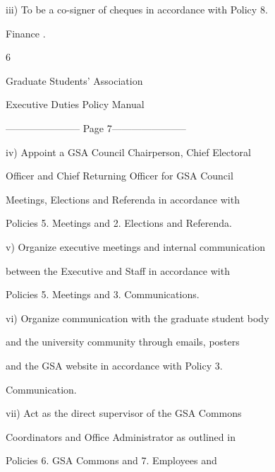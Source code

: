   

         iii)      To be a co-signer of cheques in accordance with Policy 8.  

                   Finance .   

  



                                                   6  

                                      

                                    Graduate Students’ Association  

                                    Executive Duties Policy Manual  

  


----------------------- Page 7-----------------------

         iv)      Appoint  a  GSA  Council  Chairperson,  Chief  Electoral  

                  Officer  and  Chief  Returning  Officer  for  GSA  Council  

                  Meetings,  Elections  and  Referenda  in  accordance  with  

                  Policies 5. Meetings and 2. Elections and Referenda.   

  

  

  

         v)       Organize executive meetings and internal communication  

                  between  the  Executive  and  Staff  in  accordance  with  

                  Policies 5. Meetings and 3. Communications.   

  

         vi)      Organize communication with the graduate student body  

                  and  the  university  community  through  emails,  posters  

                  and   the   GSA   website  in   accordance  with  Policy   3.  

                  Communication.   

  

         vii)     Act  as  the  direct  supervisor  of  the  GSA  Commons  

                  Coordinators  and  Office  Administrator  as  outlined  in  

                  Policies      6.   GSA      Commons   and            7.   Employees   and  

